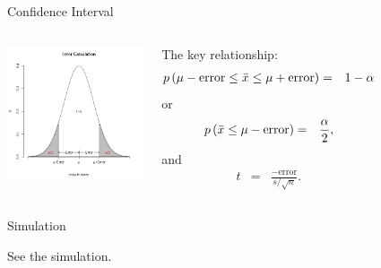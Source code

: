 \begin{frame}{Confidence Interval}

  \begin{columns}
    \centerline{\includegraphics[width=4cm]{img/confidenceInterval}}

    The key relationship:
    \begin{eqnarray*}
      p\left( \mu-\mathrm{error} \leq \bar{x} \leq \mu + \mathrm{error}\right)
      & = & 1-\alpha
    \end{eqnarray*}
    or
    \begin{eqnarray*}
      p\left( \bar{x} \leq \mu-\mathrm{error} \right) & = & \frac{\alpha}{2},
    \end{eqnarray*}
    and
    \begin{eqnarray*}
      t & = & \frac{-\mathrm{error}}{s/\sqrt{n}}.
    \end{eqnarray*}

  \end{columns}

\end{frame}


\begin{frame}{Simulation}

  See the simulation.
  
\end{frame}



